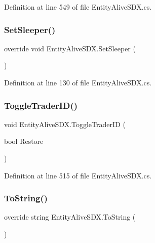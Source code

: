 Definition at line 549 of file Entity\+Alive\+S\+D\+X.\+cs.

\mbox{\label{class_entity_alive_s_d_x_a4f22c141b55a541c94cbbd46176a021f}} 
\subsubsection{\texorpdfstring{SetSleeper()}{SetSleeper()}}
{\footnotesize\ttfamily override void Entity\+Alive\+S\+D\+X.\+Set\+Sleeper (\begin{DoxyParamCaption}{ }\end{DoxyParamCaption})}



Definition at line 130 of file Entity\+Alive\+S\+D\+X.\+cs.

\mbox{\label{class_entity_alive_s_d_x_a379f0188f72d630b1241cce425e8022d}} 
\subsubsection{\texorpdfstring{ToggleTraderID()}{ToggleTraderID()}}
{\footnotesize\ttfamily void Entity\+Alive\+S\+D\+X.\+Toggle\+Trader\+ID (\begin{DoxyParamCaption}\item[{bool}]{Restore }\end{DoxyParamCaption})}



Definition at line 515 of file Entity\+Alive\+S\+D\+X.\+cs.

\mbox{\label{class_entity_alive_s_d_x_a6805f64d706b8c0d6e9e64e9300287b8}} 
\subsubsection{\texorpdfstring{ToString()}{ToString()}}
{\footnotesize\ttfamily override string Entity\+Alive\+S\+D\+X.\+To\+String (\begin{DoxyParamCaption}{ }\end{DoxyParamCaption})}




